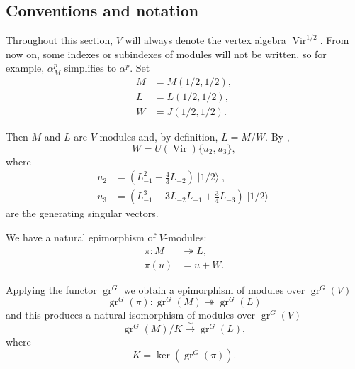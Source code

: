 \documentclass[a4paper, 12pt, reqno]{amsart}
\theoremstyle{remark}
\numberwithin{equation}{subsection}
\DeclareMathOperator{\Vir}{Vir}
\DeclareMathOperator{\gr}{gr}
\DeclareMathOperator{\vachalf}{|1/2\rangle}
\begin{document}
\subsection{Conventions and notation}
\label{sec:conventions-notation}

Throughout this section, $V$ will always denote the vertex algebra $\Vir^{1/2}$.
From now on, some indexes or subindexes of modules will not be written, so for example, $\alpha^p_M$ simplifies to $\alpha^p$.
Set
\begin{align*}
  M &= M(1/2, 1/2), \\
  L &= L(1/2, 1/2), \\
  W &= J(1/2, 1/2).
\end{align*}

Then $M$ and $L$ are $V$-modules and, by definition, $L = M/W$.
By ,
\begin{equation}
  \label{eq:37}
  W = U(\Vir)\{u_2, u_3\},
\end{equation}
where
\begin{align*}
  u_2 &= (L_{-1}^2 - \tfrac{4}{3}L_{-2})\vachalf, \\
  u_3 &= (L_{-1}^3 - 3L_{-2}L_{-1} + \tfrac{3}{4}L_{-3})\vachalf
\end{align*}
are the generating singular vectors.

We have a natural epimorphism of $V$-modules:
\begin{align*}
  \pi: M &\twoheadrightarrow L, \\
  \pi(u) &= u + W.
\end{align*}

Applying the functor $\gr^G$ we obtain a epimorphism of modules over $\gr^G(V)$
\begin{equation*}
  \gr^G(\pi): \gr^G(M) \twoheadrightarrow \gr^G(L)
\end{equation*}
and this produces a natural isomorphism of modules over $\gr^G(V)$
\begin{equation*}
  \gr^G(M)/K \xrightarrow{\sim} \gr^G(L),
\end{equation*}
where
\begin{equation}
  \label{eq:38}
  K = \ker(\gr^G(\pi)).
\end{equation}
\end{document}
